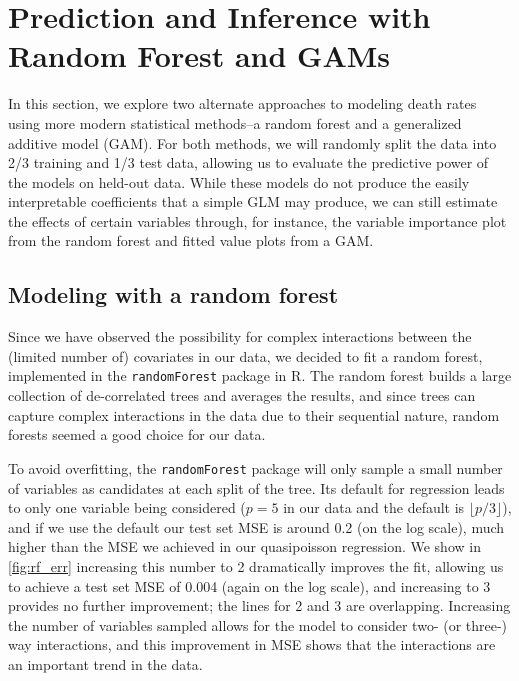 \documentclass[11pt]{article}
\begin{document}


\section{Prediction and Inference with Random Forest and GAMs}\label{sec:ml}

In this section, we explore two alternate approaches to modeling death rates using more modern statistical methods--a random forest and a generalized additive model (GAM). 
For both methods, we will randomly split the data into 2/3 training and 1/3 test data, allowing us to evaluate the predictive power of the models on held-out data.
While these models do not produce the easily interpretable coefficients that a simple GLM may produce, we can still estimate the effects of certain variables through, for instance, the variable importance plot from the random forest and fitted value plots from a GAM.

\subsection{Modeling with a random forest}\label{sec:rf}

Since we have observed the possibility for complex interactions between the (limited number of) covariates in our data, we decided to fit a random forest, implemented in the \verb+randomForest+ package in R\cite{randomforest}.
The random forest builds a large collection of de-correlated trees and averages the results, and since trees can capture complex interactions in the data due to their sequential nature, random forests seemed a good choice for our data\cite{ESL}.

To avoid overfitting, the \verb+randomForest+ package will only sample a small number of variables as candidates at each split of the tree. 
Its default for regression leads to only one variable being considered ($p = 5$ in our data and the default is $\lfloor p/3 \rfloor$), and if we use the default our test set MSE is around 0.2 (on the log scale), much higher than the MSE we achieved in our quasipoisson regression.
We show in \cref{fig:rf_err} increasing this number to 2 dramatically improves the fit, allowing us to achieve a test set MSE of 0.004 (again on the log scale), and increasing to 3 provides no further improvement; the lines for 2 and 3 are overlapping.
Increasing the number of variables sampled allows for the model to consider two- (or three-) way interactions, and this improvement in MSE shows that the interactions are an important trend in the data.
\end{document}

